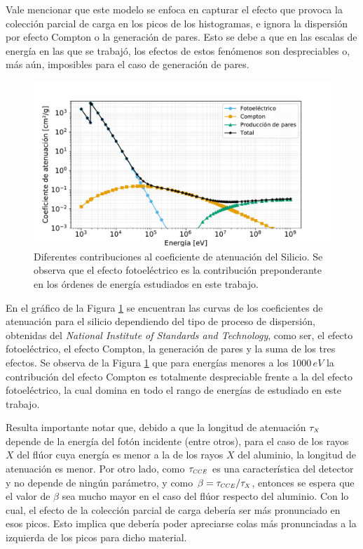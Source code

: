 Vale mencionar que este modelo se enfoca en capturar el efecto que provoca la colección parcial de carga en los picos de los histogramas, e ignora la dispersión por efecto Compton o la generación de pares. Esto se debe a que en las escalas de energía en las que se trabajó, los efectos de estos fenómenos son despreciables o, más aún, imposibles para el caso de generación de pares. 
\begin{figure}[h]
    \centering
        \includegraphics[scale=0.5]{Figs/FotoelectricoComptonPares_enSilicio.pdf}
    \caption{Diferentes contribuciones al coeficiente de atenuación del Silicio. Se observa que el efecto fotoeléctrico es la contribución preponderante en los órdenes de energía estudiados en este trabajo.}
    \label{fig:FotoelectricoComptonPares}
\end{figure}
En el gráfico de la Figura \ref{fig:FotoelectricoComptonPares} se encuentran las curvas de los coeficientes de atenuación para el silicio dependiendo del tipo de proceso de dispersión, obtenidas del \textit{National Institute of Standards and Technology}\cite{FotoComptPar}, como ser, el efecto fotoeléctrico, el efecto Compton, la generación de pares y la suma de los tres efectos. Se observa de la Figura \ref{fig:FotoelectricoComptonPares} que para energías menores a los $1000\,\si{eV}$ la contribución del efecto Compton es totalmente despreciable frente a la del efecto fotoeléctrico, la cual domina en todo el rango de energías de estudiado en este trabajo.

Resulta importante notar que, debido a que la longitud de atenuación $\tau_{\scaleto{X}{4pt}}$ depende de la energía del fotón incidente (entre otros), para el caso de los rayos $X$ del flúor cuya energía es menor a la de los rayos $X$ del aluminio, la longitud de atenuación es menor. Por otro lado, como $\tau_{\scaleto{CCE}{4pt}}$ es una característica del detector y no depende de ningún parámetro, y como $\beta = \tau_{\scaleto{CCE}{4pt}}/\tau_{\scaleto{X}{4pt}}$, entonces se espera que el valor de $\beta$ sea mucho mayor en el caso del flúor respecto del aluminio. Con lo cual, el efecto de la colección parcial de carga debería ser más pronunciado en esos picos. Esto implica que debería poder apreciarse colas más pronunciadas a la izquierda de los picos para dicho material.

